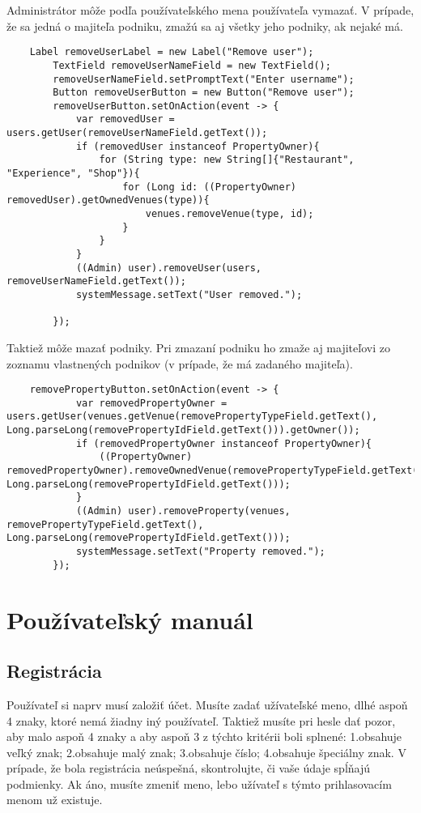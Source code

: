 \documentclass{article}
\begin{document}
Administrátor môže podľa používateľského mena používateľa vymazať. V prípade, že sa jedná o majiteľa podniku, zmažú sa aj všetky jeho podniky, ak nejaké má.
\begin{verbatim}
    Label removeUserLabel = new Label("Remove user");
        TextField removeUserNameField = new TextField();
        removeUserNameField.setPromptText("Enter username");
        Button removeUserButton = new Button("Remove user");
        removeUserButton.setOnAction(event -> {
            var removedUser = users.getUser(removeUserNameField.getText());
            if (removedUser instanceof PropertyOwner){
                for (String type: new String[]{"Restaurant", "Experience", "Shop"}){
                    for (Long id: ((PropertyOwner) removedUser).getOwnedVenues(type)){
                        venues.removeVenue(type, id);
                    }
                }
            }
            ((Admin) user).removeUser(users, removeUserNameField.getText());
            systemMessage.setText("User removed.");

        });
\end{verbatim}
Taktiež môže mazať podniky. Pri zmazaní podniku ho zmaže aj majiteľovi zo zoznamu vlastnených podnikov (v prípade, že má zadaného majiteľa).
\begin{verbatim}
    removePropertyButton.setOnAction(event -> {
            var removedPropertyOwner = users.getUser(venues.getVenue(removePropertyTypeField.getText(), Long.parseLong(removePropertyIdField.getText())).getOwner());
            if (removedPropertyOwner instanceof PropertyOwner){
                ((PropertyOwner) removedPropertyOwner).removeOwnedVenue(removePropertyTypeField.getText(), Long.parseLong(removePropertyIdField.getText()));
            }
            ((Admin) user).removeProperty(venues, removePropertyTypeField.getText(), Long.parseLong(removePropertyIdField.getText()));
            systemMessage.setText("Property removed.");
        });
\end{verbatim}

\section{Používateľský manuál}
\subsection{Registrácia}
Používateľ si naprv musí založiť účet. Musíte zadať užívateľské meno, dlhé aspoň 4 znaky, ktoré nemá žiadny iný používateľ. Taktiež musíte pri hesle dať pozor, aby malo aspoň 4 znaky a aby aspoň 3 z týchto kritérii boli splnené:
1.obsahuje veľký znak; 2.obsahuje malý znak; 3.obsahuje číslo; 4.obsahuje špeciálny znak. 
V prípade, že bola registrácia neúspešná, skontrolujte, či vaše údaje spĺňajú podmienky. Ak áno, musíte zmeniť meno, lebo užívateľ s týmto prihlasovacím menom už existuje.
\end{document}
